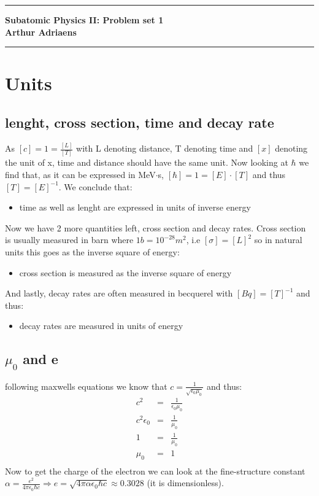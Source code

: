 \documentclass[10pt,a4paper,twoside]{article}
\begin{document}
	\begin{center}
		\hrule
		\vspace{.4cm}
		{\bf {\huge Subatomic Physics II: Problem set 1}}
		\vspace{.2cm}
		\\
		{\bf Arthur Adriaens}
		\vspace{.2cm}
		\hrule
	\end{center}

\section{Units}
\subsection{lenght, cross section, time and decay rate}
As $\left[c\right] = 1 = \frac{\left[L\right]}{\left[T\right]}$ with L denoting distance, T denoting time and $\left[x\right]$ denoting the unit of x, time and distance should have the same unit. Now looking at $\hbar$ we find that, as it can be expressed in MeV$\cdot$s, $\left[\hbar\right] = 1 = \left[E\right]\cdot\left[T\right]$ and thus $\left[T\right] = \left[E\right]^{-1}$.  
We conclude that:
\begin{itemize}
	\item time as well as lenght are expressed in units of inverse energy
\end{itemize}
Now we have 2 more quantities left, cross section and decay rates. Cross section is usually measured in barn where $1b = 10^{-28}m^2$, i.e $\left[\sigma\right] = \left[L\right]^2$ so in natural units this goes as the inverse square of energy:
\begin{itemize}
	\item cross section is measured as the inverse square of energy
\end{itemize}
And lastly, decay rates are often measured in becquerel with $\left[Bq\right] = \left[T\right]^{-1}$ and thus:
\begin{itemize}
	\item decay rates are measured in units of energy
\end{itemize}
\subsection{$\mu_0$ and e}
following maxwells equations we know that $c = \frac{1}{\sqrt{\epsilon_0\mu_0}}$ and thus:
\begin{eqnarray}
	c^2 &=& \frac{1}{\epsilon_0\mu_0}\\
	c^2\epsilon_0 &=& \frac{1}{\mu_0}\\
	1 &=& \frac{1}{\mu_0}\\
	\mu_0 &=& 1\\
\end{eqnarray}
Now to get the charge of the electron we can look at the fine-structure constant $\alpha = \frac{e^2}{4\pi\epsilon_0\hbar c} \Rightarrow e = \sqrt{4\pi\alpha\epsilon_0\hbar c} \approx 0.3028$ (it is dimensionless).
\end{document}
